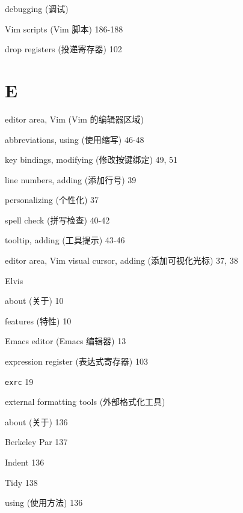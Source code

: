 \begin{multicols}{2}
\hangindent=3pc  debugging (调试) \par
\hangindent=3pc \quad Vim scripts (Vim 脚本) 186-188 \par

\hangindent=3pc  drop registers (投递寄存器) 102

\hangindent=3pc  \section*{E}

\hangindent=3pc  editor area, Vim (Vim 的编辑器区域) \par
\hangindent=3pc \quad abbreviations, using (使用缩写) 46-48 \par
\hangindent=3pc \quad key bindings, modifying (修改按键绑定) 49, 51 \par
\hangindent=3pc \quad line numbers, adding (添加行号) 39 \par
\hangindent=3pc \quad personalizing (个性化) 37 \par
\hangindent=3pc \quad spell check (拼写检查) 40-42 \par
\hangindent=3pc \quad tooltip, adding (工具提示) 43-46 \par
\hangindent=3pc \quad editor area, Vim visual cursor, adding (添加可视化光标) 37, 38 \par

\hangindent=3pc  Elvis \par
\hangindent=3pc \quad about (关于) 10 \par
\hangindent=3pc \quad features (特性) 10 \par

\hangindent=3pc  Emacs editor (Emacs 编辑器) 13

\hangindent=3pc  expression register (表达式寄存器) 103

\hangindent=3pc  \texttt{exrc} 19

\hangindent=3pc  external formatting tools (外部格式化工具) \par
\hangindent=3pc \quad about (关于) 136 \par
\hangindent=3pc \quad Berkeley Par 137 \par
\hangindent=3pc \quad Indent 136 \par
\hangindent=3pc \quad Tidy 138 \par
\hangindent=3pc \quad using (使用方法) 136 \par


\end{multicols}
